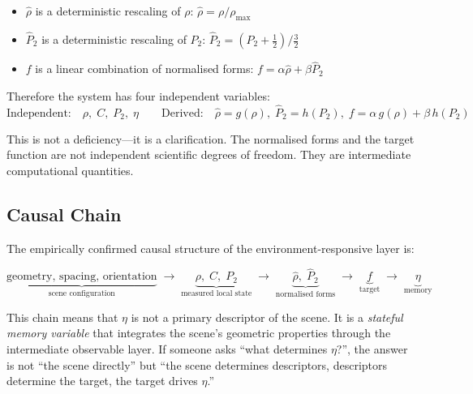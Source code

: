 \documentclass[11pt]{article}
\begin{document}
\begin{itemize}
    \item $\hat{\rho}$ is a deterministic rescaling of $\rho$:
          $\hat{\rho} = \rho / \rho_{\max}$
    \item $\hat{P}_2$ is a deterministic rescaling of $P_2$:
          $\hat{P}_2 = (P_2 + \tfrac{1}{2}) / \tfrac{3}{2}$
    \item $f$ is a linear combination of normalised forms:
          $f = \alpha\hat{\rho} + \beta\hat{P}_2$
\end{itemize}

Therefore the system has four independent variables:
\begin{equation}
\boxed{
    \text{Independent:}\quad \rho,\; C,\; P_2,\; \eta
    \qquad
    \text{Derived:}\quad \hat{\rho} = g(\rho),\;
    \hat{P}_2 = h(P_2),\;
    f = \alpha\, g(\rho) + \beta\, h(P_2)
}
\end{equation}

This is not a deficiency---it is a clarification.  The normalised forms
and the target function are not independent scientific degrees of freedom.
They are intermediate computational quantities.

\subsection{Causal Chain}

The empirically confirmed causal structure of the environment-responsive
layer is:

\begin{equation}
    \underbrace{
        \text{geometry, spacing, orientation}
    }_{\text{scene configuration}}
    \;\longrightarrow\;
    \underbrace{
        \rho,\; C,\; P_2
    }_{\text{measured local state}}
    \;\longrightarrow\;
    \underbrace{
        \hat{\rho},\; \hat{P}_2
    }_{\text{normalised forms}}
    \;\longrightarrow\;
    \underbrace{
        f
    }_{\text{target}}
    \;\longrightarrow\;
    \underbrace{
        \eta
    }_{\text{memory}}
\end{equation}

This chain means that $\eta$ is not a primary descriptor of the scene.  It
is a \emph{stateful memory variable} that integrates the scene's geometric
properties through the intermediate observable layer.  If someone asks
``what determines $\eta$?'', the answer is not ``the scene directly'' but
``the scene determines descriptors, descriptors determine the target, the
target drives $\eta$.''
\end{document}
